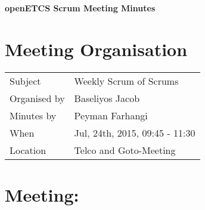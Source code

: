 \documentclass[a4paper, 11pt]{article}
\begin{document}
{\begin{center}\huge\bf openETCS Scrum Meeting Minutes\end{center}}
\section{Meeting Organisation}

\renewcommand{\arraystretch}{1.5}
\begin{supertabular}{m{.2\textwidth}m{.8\textwidth}}
Subject & Weekly Scrum of Scrums\\
Organised by & Baseliyos Jacob\\
Minutes by & Peyman Farhangi\\
When & Jul, 24th, 2015, 09:45 - 11:30\\
Location & Telco and Goto-Meeting\\
\end{supertabular}

\renewcommand{\arraystretch}{1.0}
\section{Meeting:}
\end{document}

